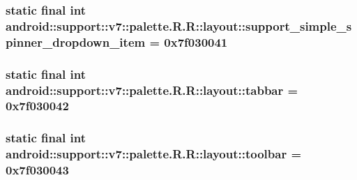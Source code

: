 \hypertarget{classandroid_1_1support_1_1v7_1_1palette_1_1_r_1_1layout_f570c26a7ef0320507cc36610b0ad101}{
\subsubsection[{support\_\-simple\_\-spinner\_\-dropdown\_\-item}]{\setlength{\rightskip}{0pt plus 5cm}static final int android::support::v7::palette.R.R::layout::support\_\-simple\_\-spinner\_\-dropdown\_\-item = 0x7f030041}}
\label{classandroid_1_1support_1_1v7_1_1palette_1_1_r_1_1layout_f570c26a7ef0320507cc36610b0ad101}


\hypertarget{classandroid_1_1support_1_1v7_1_1palette_1_1_r_1_1layout_e2487a96b5af387b648eeab188739d01}{
\subsubsection[{tabbar}]{\setlength{\rightskip}{0pt plus 5cm}static final int android::support::v7::palette.R.R::layout::tabbar = 0x7f030042}}
\label{classandroid_1_1support_1_1v7_1_1palette_1_1_r_1_1layout_e2487a96b5af387b648eeab188739d01}


\hypertarget{classandroid_1_1support_1_1v7_1_1palette_1_1_r_1_1layout_935f3b011c54688b7728f87369cbb105}{
\subsubsection[{toolbar}]{\setlength{\rightskip}{0pt plus 5cm}static final int android::support::v7::palette.R.R::layout::toolbar = 0x7f030043}}
\label{classandroid_1_1support_1_1v7_1_1palette_1_1_r_1_1layout_935f3b011c54688b7728f87369cbb105}




